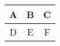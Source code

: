 \documentclass{article}
\begin{document}
\begin{tabular}{|c|c|c|}
\hline
A & B & C \\ \hline
D & E & F \\ \hline
\end{tabular}
\end{document}
